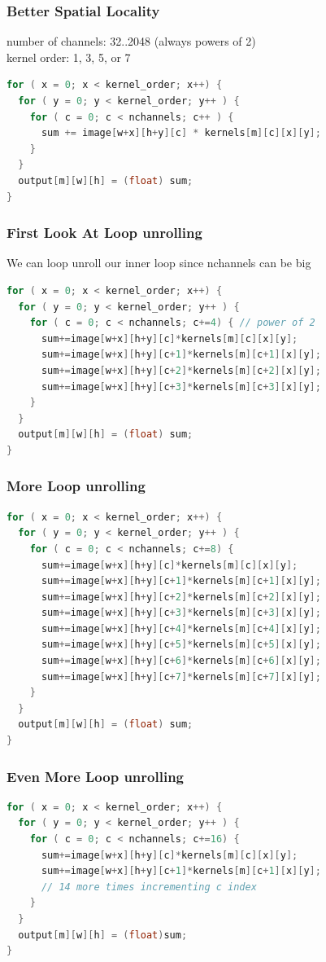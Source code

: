 \documentclass{beamer}
\begin{document}
\begin{frame}[fragile]
\frametitle{Better Spatial Locality}
number of channels: 32..2048 (always powers of 2) \\
kernel order: 1, 3, 5, or 7
\begin{lstlisting}[language=C,keywordstyle=\color{blue}]
for ( x = 0; x < kernel_order; x++) {
  for ( y = 0; y < kernel_order; y++ ) {
    for ( c = 0; c < nchannels; c++ ) {
      sum += image[w+x][h+y][c] * kernels[m][c][x][y];
    }
  }
  output[m][w][h] = (float) sum;
}
\end{lstlisting}
\end{frame}

\begin{frame}[fragile]
\frametitle{First Look At Loop unrolling}
We can loop unroll our inner loop since nchannels can be big
\begin{lstlisting}[language=C,keywordstyle=\color{blue}]
for ( x = 0; x < kernel_order; x++) {
  for ( y = 0; y < kernel_order; y++ ) {
    for ( c = 0; c < nchannels; c+=4) { // power of 2 
      sum+=image[w+x][h+y][c]*kernels[m][c][x][y];
      sum+=image[w+x][h+y][c+1]*kernels[m][c+1][x][y];
      sum+=image[w+x][h+y][c+2]*kernels[m][c+2][x][y];
      sum+=image[w+x][h+y][c+3]*kernels[m][c+3][x][y];
    }
  }
  output[m][w][h] = (float) sum;
}
\end{lstlisting}
\end{frame}

\begin{frame}[fragile]
\frametitle{More Loop unrolling}
\begin{lstlisting}[language=C,keywordstyle=\color{blue}]
for ( x = 0; x < kernel_order; x++) {
  for ( y = 0; y < kernel_order; y++ ) {
    for ( c = 0; c < nchannels; c+=8) {
      sum+=image[w+x][h+y][c]*kernels[m][c][x][y];
      sum+=image[w+x][h+y][c+1]*kernels[m][c+1][x][y];
      sum+=image[w+x][h+y][c+2]*kernels[m][c+2][x][y];
      sum+=image[w+x][h+y][c+3]*kernels[m][c+3][x][y];
      sum+=image[w+x][h+y][c+4]*kernels[m][c+4][x][y];
      sum+=image[w+x][h+y][c+5]*kernels[m][c+5][x][y];
      sum+=image[w+x][h+y][c+6]*kernels[m][c+6][x][y];
      sum+=image[w+x][h+y][c+7]*kernels[m][c+7][x][y];
    }
  }
  output[m][w][h] = (float) sum;
}
\end{lstlisting}
\end{frame}

\begin{frame}[fragile]
\frametitle{Even More Loop unrolling}
\begin{lstlisting}[language=C,keywordstyle=\color{blue}]
for ( x = 0; x < kernel_order; x++) {
  for ( y = 0; y < kernel_order; y++ ) {
    for ( c = 0; c < nchannels; c+=16) {
      sum+=image[w+x][h+y][c]*kernels[m][c][x][y];
      sum+=image[w+x][h+y][c+1]*kernels[m][c+1][x][y];
      // 14 more times incrementing c index
    }
  }
  output[m][w][h] = (float)sum;
}
\end{lstlisting}
\end{frame}
\end{document}
